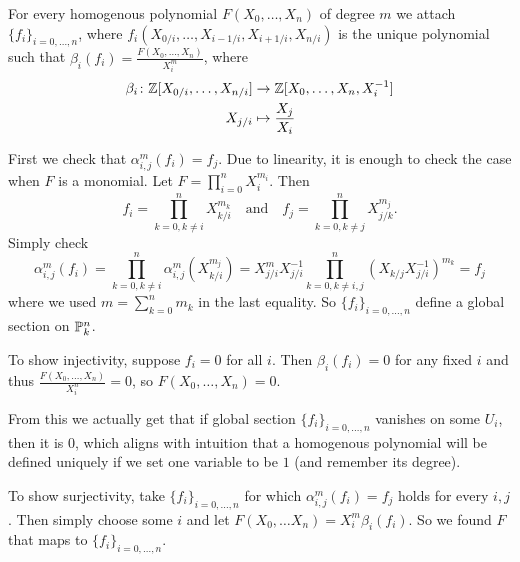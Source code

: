 \begin{exercise}{2}
    For every homogenous polynomial $F(X_0, \dots, X_n)$ of degree $m$ we attach
    $\{f_i\}_{i=0,\dots,n}$, where $f_i(X_{0/i}, \dots, X_{i-1/i}, X_{i+1/i},
    X_{n/i})$ is the unique polynomial such that $\beta_i(f_i) = \frac{F(X_0,
    \dots, X_n)}{X^m_i}$, where
    \begin{align*}
        \beta_i \colon \mathbb{Z}[X_{0/i}, \dots, X_{n/i}] &\to \mathbb{Z}[X_0, \dots, X_n,
        X^{-1}_i] \\
        X_{j/i} &\mapsto \frac{X_j}{X_i}
    \end{align*}
    
    First we check that $\alpha^m_{i, j} (f_i) = f_j$. Due to linearity, it is
    enough to check the case when $F$ is a monomial. Let $F = \prod^n_{i = 0}
    X^{m_i}_i$. Then
    \begin{equation*}
        f_i = \prod^n_{k = 0, k \not= i} X^{m_k}_{k/i} \quad\text{and}\quad f_j
        = \prod^n_{k = 0, k \not= j} X^{m_j}_{j/k}.
    \end{equation*}
    Simply check
    \begin{equation*}
        \alpha^m_{i, j} (f_i) =
        \prod^n_{k = 0, k \not= i} \alpha^m_{i, j} (X^{m_j}_{k/i}) =
        X^m_{j/i} X^{-1}_{j/i} \prod^n_{k = 0, k \not= i, j} (X_{k/j}
        X^{-1}_{j/i})^{m_k} = f_j
    \end{equation*}
    where we used $m = \sum^n_{k=0} m_k$ in the last equality.
    So $\{f_i\}_{i = 0, \dots, n}$ define a global section on $\mathbb{P}^n_k$.

    To show injectivity, suppose $f_i = 0$ for all $i$. Then $\beta_i(f_i) = 0$
    for any fixed $i$ and thus $\frac{F(X_0, \dots, X_n)}{X^n_i} = 0$, so
    $F(X_0, \dots, X_n) = 0$.

    From this we actually get that if global section $\{f_i\}_{i = 0, \dots, n}$
    vanishes on some $U_i$, then it is $0$, which aligns with intuition that a
    homogenous polynomial will be defined uniquely if we set one variable to be
    $1$ (and remember its degree).

    To show surjectivity, take $\{f_i\}_{i = 0, \dots, n}$ for which
    $\alpha^m_{i, j} (f_i) = f_j$ holds for every $i, j$. Then simply choose
    some $i$ and let $F(X_0, \dots X_n) = X^m_i \beta_i(f_i)$. So we found $F$
    that maps to $\{f_i\}_{i = 0, \dots, n}$.

\end{exercise}

